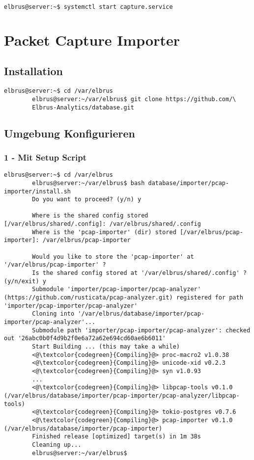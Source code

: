 \documentclass{article}
\begin{document}
	\begin{lstlisting}[caption={Starten des Serviceprogrammes}]
		elbrus@server:~$ systemctl start capture.service
	\end{lstlisting}
	
	\newpage
	
	
	\section{Packet Capture Importer}
	\subsection{Installation}
	\begin{lstlisting}[caption={Clonen der Software von GitHub.}]
		elbrus@server:~$ cd /var/elbrus
		elbrus@server:~/var/elbrus$ git clone https://github.com/\
		Elbrus-Analytics/database.git
	\end{lstlisting}

	\subsection[file config]{Umgebung Konfigurieren}
	\subsubsection{1 - Mit Setup Script}
	\begin{lstlisting}[caption={Ausführen des setup Scripts}, breaklines=true,]
		elbrus@server:~$ cd /var/elbrus
		elbrus@server:~/var/elbrus$ bash database/importer/pcap-importer/install.sh
		Do you want to proceed? (y/n) y
		
		Where is the shared config stored [/var/elbrus/shared/.config]: /var/elbrus/shared/.config
		Where is the 'pcap-importer' (dir) stored [/var/elbrus/pcap-importer]: /var/elbrus/pcap-importer
		
		Would you like to store the 'pcap-importer' at '/var/elbrus/pcap-importer' ?
		Is the shared config stored at '/var/elbrus/shared/.config' ? (y/n/exit) y
		Submodule 'importer/pcap-importer/pcap-analyzer' (https://github.com/rusticata/pcap-analyzer.git) registered for path 'importer/pcap-importer/pcap-analyzer'
		Cloning into '/var/elbrus/database/importer/pcap-importer/pcap-analyzer'...
		Submodule path 'importer/pcap-importer/pcap-analyzer': checked out '26abc0b0f4d9b2f0e6a72a62e694cd60ae6b6011'
		Start Building ... (this may take a while)
		<@\textcolor{codegreen}{Compiling}@> proc-macro2 v1.0.38
		<@\textcolor{codegreen}{Compiling}@> unicode-xid v0.2.3
		<@\textcolor{codegreen}{Compiling}@> syn v1.0.93
		...
		<@\textcolor{codegreen}{Compiling}@> libpcap-tools v0.1.0 (/var/elbrus/database/importer/pcap-importer/pcap-analyzer/libpcap-tools)
		<@\textcolor{codegreen}{Compiling}@> tokio-postgres v0.7.6
		<@\textcolor{codegreen}{Compiling}@> pcap-importer v0.1.0 (/var/elbrus/database/importer/pcap-importer)
		Finished release [optimized] target(s) in 1m 38s
		Cleaning up...
		elbrus@server:~/var/elbrus$
	\end{lstlisting}
	
\end{document}
